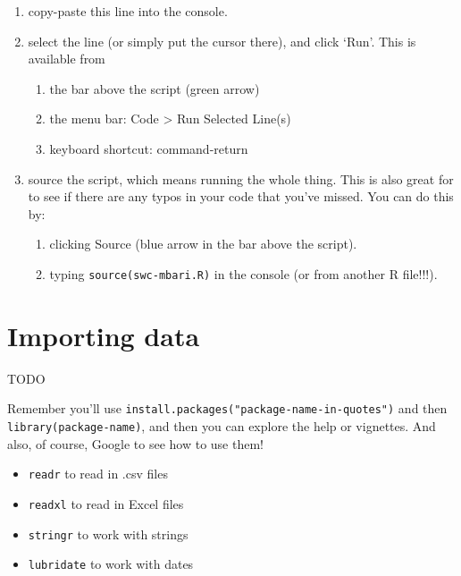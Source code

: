 \documentclass[]{book}
\providecommand{\tightlist}{%
  \setlength{\itemsep}{0pt}\setlength{\parskip}{0pt}}
\theoremstyle{definition}
\theoremstyle{definition}
\theoremstyle{definition}
\theoremstyle{remark}
\begin{document}
\begin{enumerate}
\def\labelenumi{\arabic{enumi}.}
\tightlist
\item
  copy-paste this line into the console.
\item
  select the line (or simply put the cursor there), and click `Run'.
  This is available from

  \begin{enumerate}
  \def\labelenumii{\alph{enumii}.}
  \tightlist
  \item
    the bar above the script (green arrow)
  \item
    the menu bar: Code \textgreater{} Run Selected Line(s)
  \item
    keyboard shortcut: command-return
  \end{enumerate}
\item
  source the script, which means running the whole thing. This is also
  great for to see if there are any typos in your code that you've
  missed. You can do this by:

  \begin{enumerate}
  \def\labelenumii{\alph{enumii}.}
  \tightlist
  \item
    clicking Source (blue arrow in the bar above the script).
  \item
    typing
    \texttt{source(\textquotesingle{}swc-mbari.R\textquotesingle{})} in
    the console (or from another R file!!!).
  \end{enumerate}
\end{enumerate}

\section{Importing data}\label{importing-data}

TODO

Remember you'll use \texttt{install.packages("package-name-in-quotes")}
and then \texttt{library(package-name)}, and then you can explore the
help or vignettes. And also, of course, Google to see how to use them!

\begin{itemize}
\tightlist
\item
  \texttt{readr} to read in .csv files
\item
  \texttt{readxl} to read in Excel files
\item
  \texttt{stringr} to work with strings
\item
  \texttt{lubridate} to work with dates
\end{itemize}
\end{document}
